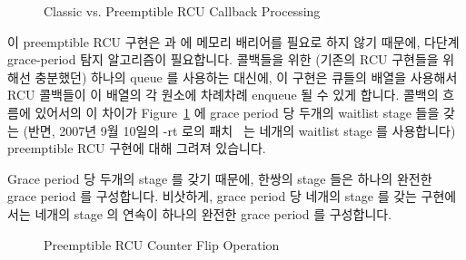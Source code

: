 \begin{figure}[htb]
\centering
{}
\caption{Classic vs. Preemptible RCU Callback Processing}
\label{app:rcuimpl:Classic vs. Preemptible RCU Callback Processing}
\end{figure}

이 preemptible RCU 구현은  과  에
메모리 배리어를 필요로 하지 않기 때문에, 다단계 grace-period 탐지 알고리즘이
필요합니다.
콜백들을 위한 (기존의 RCU 구현들을 위해선 충분했던) 하나의  queue 를
사용하는 대신에, 이 구현은  큐들의 배열을 사용해서 RCU 콜백들이 이
배열의 각 원소에 차례차례 enqueue 될 수 있게 합니다.
콜백의 흐름에 있어서의 이 차이가
Figure~\ref{app:rcuimpl:Classic vs. Preemptible RCU Callback Processing}
에 grace period 당 두개의 waitlist stage 들을 갖는 (반면, 2007년 9월 10일의 -rt
로의 패치~\cite{PaulEMcKenney2007PreemptibleRCUPatch} 는 네개의 waitlist stage
를 사용합니다) preemptible RCU 구현에 대해 그려져 있습니다.

Grace period 당 두개의 stage 를 갖기 때문에, 한쌍의 stage 들은 하나의 완전한
grace period 를 구성합니다.
비삿하게, grace period 당 네개의 stage 를 갖는 구현에서는 네개의 stage 의
연속이 하나의 완전한 grace period 를 구성합니다.

\begin{figure}[htb]
\centering
{}
\caption{Preemptible RCU Counter Flip Operation}
\label{app:rcuimpl:Preemptible RCU Counter Flip Operation}
\end{figure}

